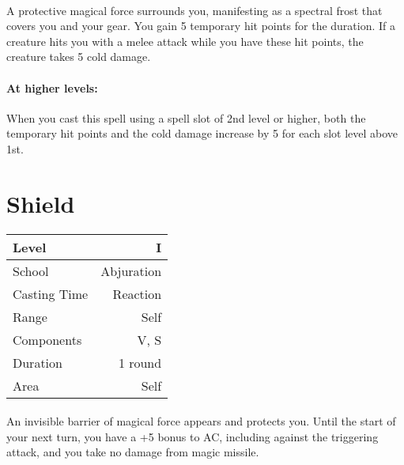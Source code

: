 \documentclass[a5paper,12pt]{article}
\begin{document}
\paragraph{}
A protective magical force surrounds you, manifesting as a spectral frost that covers you and your gear. You gain 5 temporary hit points for the duration. If a creature hits you with a melee attack while you have these hit points, the creature takes 5 cold damage.

\paragraph{At higher levels:}
When you cast this spell using a spell slot of 2nd level or higher, both the temporary hit points and the cold damage increase by 5 for each slot level above 1st.

\newpage

\section*{Shield}
\begin{table}[h]
   \centering
   \begin{tabular}{|l|r|}
      \hline
      Level        & I \\
      \hline
      School       & Abjuration \\
      \hline
      Casting Time & Reaction \\
      \hline
      Range        & Self \\
      \hline
      Components   & V, S \\
      \hline
      Duration     & 1 round \\
      \hline
      Area         & Self \\
      \hline
   \end{tabular}
\end{table}

\paragraph{}
An invisible barrier of magical force appears and protects you. Until the start of your next turn, you have a +5 bonus to AC, including against the triggering attack, and you take no damage from magic missile.

\newpage
\end{document}
